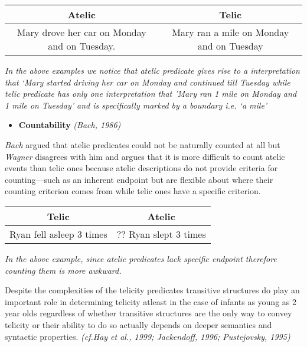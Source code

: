 \documentclass[11pt]{article}
\providecommand{\tightlist}{%
      \setlength{\itemsep}{0pt}\setlength{\parskip}{0pt}}
\begin{document}
\begin{longtable}[]{@{}cc@{}}
\toprule
\begin{minipage}[b]{0.45\columnwidth}\centering
Atelic\strut
\end{minipage} & \begin{minipage}[b]{0.49\columnwidth}\centering
Telic\strut
\end{minipage}\tabularnewline
\midrule
\endhead
\begin{minipage}[t]{0.45\columnwidth}\centering
Mary drove her car on Monday and on Tuesday.\strut
\end{minipage} & \begin{minipage}[t]{0.49\columnwidth}\centering
Mary ran a mile on Monday and on Tuesday\strut
\end{minipage}\tabularnewline
\bottomrule
\end{longtable}

\emph{In the above examples we notice that atelic predicate gives rise
to a interpretation that `Mary started driving her car on Monday and
continued till Tuesday while telic predicate has only one interpretation
that 'Mary ran 1 mile on Monday and 1 mile on Tuesday' and is
specifically marked by a boundary i.e. `a mile'}

    \begin{itemize}
\tightlist
\item
  \textbf{Countability} \emph{(Bach, 1986)}
\end{itemize}

\emph{Bach} argued that atelic predicates could not be naturally counted
at all but \emph{Wagner} disagrees with him and argues that it is more
difficult to count atelic events than telic ones because atelic
descriptions do not provide criteria for counting---such as an inherent
endpoint but are flexible about where their counting criterion comes
from while telic ones have a specific criterion.

\begin{longtable}[]{@{}cc@{}}
\toprule
Telic & Atelic\tabularnewline
\midrule
\endhead
Ryan fell asleep 3 times & ?? Ryan slept 3 times\tabularnewline
\bottomrule
\end{longtable}

\emph{In the above example, since atelic predicates lack specific
endpoint therefore counting them is more awkward.}

    Despite the complexities of the telicity predicates transitive
structures do play an important role in determining telicity atleast in
the case of infants as young as 2 year olds regardless of whether
transitive structures are the only way to convey telicity or their
ability to do so actually depends on deeper semantics and syntactic
properties. \emph{(cf.Hay et al., 1999; Jackendoff, 1996; Pustejovsky,
1995)}
\end{document}
